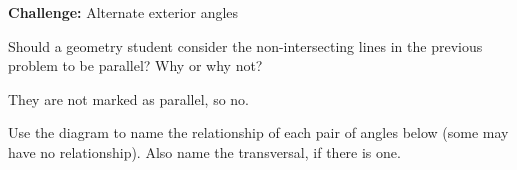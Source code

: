 \begin{exercises}
\begin{ex}
\begin{exparts}
\begin{multicols}{2}
		\item \textbf{Challenge:  }Alternate exterior angles
	\end{multicols}
	\end{exparts}
	\begin{sol}
	\hspace*{\fill}
	\end{sol}
	\end{ex}

	\begin{ex}
	\e Should a geometry student consider the non-intersecting lines 
	in the previous problem to be parallel?
	Why or why not?
	\begin{sol}They are not marked as parallel, so no.\end{sol}
	\end{ex}
	
	\smallskip
	\newpage

	\begin{ex}
	\e Use the diagram to name the relationship of each pair of angles below (some may have no relationship).  Also name the transversal, if there is one.


\end{ex}
\end{exercises}
